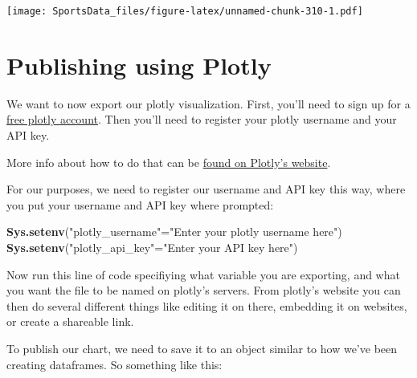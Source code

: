 \documentclass[
]{book}
\newenvironment{Shaded}{\begin{snugshade}}{\end{snugshade}}
\newcommand{\KeywordTok}[1]{\textcolor[rgb]{0.13,0.29,0.53}{\textbf{#1}}}
\newcommand{\NormalTok}[1]{#1}
\newcommand{\StringTok}[1]{\textcolor[rgb]{0.31,0.60,0.02}{#1}}
\begin{document}
\texttt{[image: SportsData\_files/figure-latex/unnamed-chunk-310-1.pdf]}

\hypertarget{publishing-using-plotly}{%
\section{Publishing using Plotly}\label{publishing-using-plotly}}

We want to now export our plotly visualization. First, you'll need to sign up for a \href{https://chart-studio.plotly.com/Auth/login/\#/}{free plotly account}. Then you'll need to register your plotly username and your API key.

More info about how to do that can be \href{https://plot.ly/r/getting-started/\#initialization-for-online-plotting}{found on Plotly's website}.

For our purposes, we need to register our username and API key this way, where you put your username and API key where prompted:

\begin{Shaded}
\begin{Highlighting}[]
\KeywordTok{Sys.setenv}\NormalTok{(}\StringTok{"plotly_username"}\NormalTok{=}\StringTok{"Enter your plotly username here"}\NormalTok{)}
\KeywordTok{Sys.setenv}\NormalTok{(}\StringTok{"plotly_api_key"}\NormalTok{=}\StringTok{"Enter your API key here"}\NormalTok{)}
\end{Highlighting}
\end{Shaded}

Now run this line of code specifiying what variable you are exporting, and what you want the file to be named on plotly's servers. From plotly's website you can then do several different things like editing it on there, embedding it on websites, or create a shareable link.

To publish our chart, we need to save it to an object similar to how we've been creating dataframes. So something like this:
\end{document}
